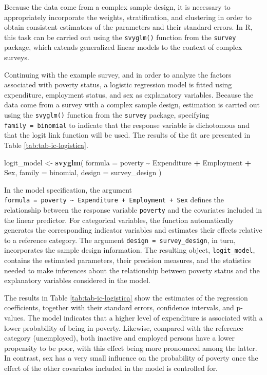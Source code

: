\documentclass[
  english,
  12pt,
]{book}
\newenvironment{Shaded}{\begin{snugshade}}{\end{snugshade}}
\newcommand{\AttributeTok}[1]{\textcolor[rgb]{0.13,0.29,0.53}{#1}}
\newcommand{\FunctionTok}[1]{\textcolor[rgb]{0.13,0.29,0.53}{\textbf{#1}}}
\newcommand{\NormalTok}[1]{#1}
\newcommand{\OtherTok}[1]{\textcolor[rgb]{0.56,0.35,0.01}{#1}}
\newcommand{\SpecialCharTok}[1]{\textcolor[rgb]{0.81,0.36,0.00}{\textbf{#1}}}
\begin{document}
Because the data come from a complex sample design, it is necessary to appropriately incorporate the weights, stratification, and clustering in order to obtain consistent estimators of the parameters and their standard errors. In R, this task can be carried out using the \texttt{svyglm()} function from the \texttt{survey} package, which extends generalized linear models to the context of complex surveys.

Continuing with the example survey, and in order to analyze the factors associated with poverty status, a logistic regression model is fitted using expenditure, employment status, and sex as explanatory variables. Because the data come from a survey with a complex sample design, estimation is carried out using the \texttt{svyglm()} function from the \texttt{survey} package, specifying \texttt{family\ =\ binomial} to indicate that the response variable is dichotomous and that the logit link function will be used. The results of the fit are presented in Table \ref{tab:tab-ic-logistica}.

\begin{Shaded}
\begin{Highlighting}[]
\NormalTok{logit\_model }\OtherTok{\textless{}{-}} \FunctionTok{svyglm}\NormalTok{(}
  \AttributeTok{formula =}\NormalTok{ poverty }\SpecialCharTok{\textasciitilde{}}\NormalTok{ Expenditure }\SpecialCharTok{+}\NormalTok{ Employment }\SpecialCharTok{+}\NormalTok{ Sex,}
  \AttributeTok{family =}\NormalTok{ binomial,}
  \AttributeTok{design =}\NormalTok{ survey\_design}
\NormalTok{)}
\end{Highlighting}
\end{Shaded}

In the model specification, the argument \texttt{formula\ =\ poverty\ \textasciitilde{}\ Expenditure\ +\ Employment\ +\ Sex} defines the relationship between the response variable \texttt{poverty} and the covariates included in the linear predictor. For categorical variables, the function automatically generates the corresponding indicator variables and estimates their effects relative to a reference category. The argument \texttt{design\ =\ survey\_design}, in turn, incorporates the sample design information. The resulting object, \texttt{logit\_model}, contains the estimated parameters, their precision measures, and the statistics needed to make inferences about the relationship between poverty status and the explanatory variables considered in the model.

The results in Table \ref{tab:tab-ic-logistica} show the estimates of the regression coefficients, together with their standard errors, confidence intervals, and p-values. The model indicates that a higher level of expenditure is associated with a lower probability of being in poverty. Likewise, compared with the reference category (unemployed), both inactive and employed persons have a lower propensity to be poor, with this effect being more pronounced among the latter. In contrast, sex has a very small influence on the probability of poverty once the effect of the other covariates included in the model is controlled for.
\end{document}

